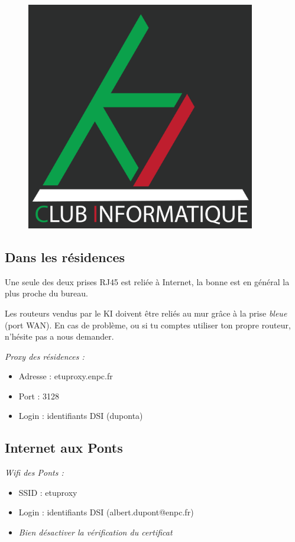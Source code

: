 \documentclass{../templates/enpc-ki/ki019}
\begin{document}
    \begin{figure}[H]
      \centering
      \includegraphics[width=10cm]{page2}
    \end{figure}

    \vspace{2cm}
    \begin{kiframe}
      \subsection{Dans les résidences} %
        Une seule des deux prises RJ45 est reliée à Internet, la bonne est en général la plus proche du bureau.

        Les routeurs vendus par le KI doivent être reliés au mur grâce à la prise \emph{bleue} (port WAN). En cas de problème, ou si tu comptes utiliser ton propre routeur, n'hésite pas a nous demander.

        \begin{flushleft}
          \emph{Proxy des résidences :}
          \begin{itemize}
            \item Adresse : etuproxy.enpc.fr
            \item Port : 3128
            \item Login : identifiants DSI (duponta)
          \end{itemize}
        \end{flushleft}

      \subsection{Internet aux Ponts}
        \begin{flushleft}
          \emph{Wifi des Ponts :}
          \begin{itemize}
            \item SSID : etuproxy
            \item Login : identifiants DSI (albert.dupont@enpc.fr)
            \item \emph{Bien désactiver la vérification du certificat}
          \end{itemize}
        \end{flushleft}
      \end{kiframe}
\end{document}
